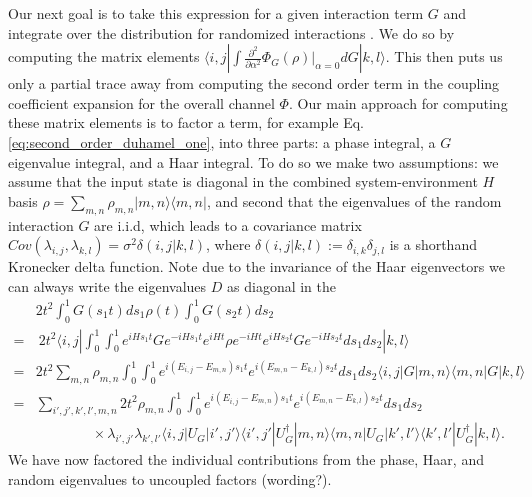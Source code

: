 \documentclass{article}
\newcommand{\ket}[1]{|#1\rangle}
\newcommand{\bra}[1]{\langle #1|}
\newcommand{\ketbra}[2]{| #1\rangle\! \langle #2|}
\begin{document}
Our next goal is to take this expression for a given interaction term $G$ and integrate over the distribution for randomized interactions .
We do so by computing the matrix elements $\bra{i,j} \int \frac{\partial^2}{\partial \alpha^2} \Phi_G(\rho) \big|_{\alpha = 0} dG \ket{k,l}$. This then puts us only a partial trace away from computing the second order term in the coupling coefficient expansion for the overall channel $\Phi$. Our main approach for computing these matrix elements is to factor a term, for example Eq. \eqref{eq:second_order_duhamel_one}, into three parts: a phase integral, a $G$ eigenvalue integral, and a Haar integral. To do so we make two assumptions: we assume that the input state is diagonal in the combined system-environment $H$ basis $\rho = \sum_{m,n} \rho_{m,n} \ketbra{m,n}{m,n}$, and second that the eigenvalues of the random interaction $G$ are i.i.d, which leads to a covariance matrix $Cov(\lambda_{i,j}, \lambda_{k,l}) = \sigma^2 \delta(i,j | k,l)$, where $\delta(i,j | k,l) := \delta_{i,k} \delta_{j,l}$ is a shorthand Kronecker delta function. Note due to the invariance of the Haar eigenvectors we can always write the eigenvalues $D$ as diagonal in the 
\begin{align}
    &2t^2 \int_0^1 G(s_1t) ds_1 \rho(t) \int_0^1 G(s_2 t) ds_2 \\
    =&~ 2 t^2 \bra{i,j} \int_{0}^1 \int_0^1 e^{i H s_1 t} G e^{-iH s_1 t} e^{i H t} \rho e^{-i H t} e^{i H s_2 t} G e^{-iH s_2 t} ds_1 ds_2 \ket{k,l} \\
    =& 2 t^2 \sum_{m,n} \rho_{m,n} \int_0^1 \int_0^1 e^{i(E_{i,j} - E_{m,n})s_1 t} e^{i(E_{m,n} - E_{k,l}) s_2 t} ds_1 ds_2 \bra{i,j}G \ketbra{m,n}{m,n} G \ket{k,l} \\
    =& \sum_{i',j',k',l',m,n} 2t^2 \rho_{m,n} \int_0^1 \int_0^1 e^{i(E_{i,j} - E_{m,n})s_1 t} e^{i(E_{m,n} - E_{k,l}) s_2 t} ds_1 ds_2 \nonumber \\
     &\quad \quad \quad \quad \times \lambda_{i',j'} \lambda_{k',l'} \bra{i,j} U_G \ket{i',j'} \bra{i',j'} U_G^\dagger \ket{m,n} \bra{m,n} U_G \ket{k',l'} \bra{k',l'} U_G^\dagger \ket{k,l}.
\end{align}
We have now factored the individual contributions from the phase, Haar, and random eigenvalues to uncoupled factors (wording?). 
\end{document}
